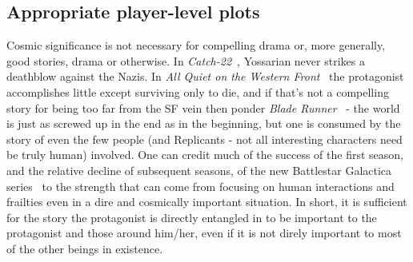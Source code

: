 \subsection{Appropriate player-level plots}

Cosmic significance is not necessary for compelling drama or, more
generally, good stories, drama or otherwise. In
\emph{Catch-22}~\cite{Catch22}, Yossarian never strikes a deathblow against
the Nazis. In \emph{All Quiet on the Western
Front}~\cite{AllQuietOnTheWesternFront} the protagonist accomplishes
little except surviving only to die, and if that's not a compelling
story for being too far from the SF vein then ponder \emph{Blade
Runner}~\cite{BladeRunner} - the world is just as screwed up in the end
as in the beginning, but one is consumed by the story of even the few
people (and Replicants - not all interesting characters need be truly
human) involved. One can credit much of the success of the first
season, and the relative decline of subsequent seasons, of the new
Battlestar Galactica series~\cite{NewBattleStar} to the strength that
can come from focusing on human interactions and frailties even in a
dire and cosmically important situation. In short, it is sufficient
for the story the protagonist is directly entangled in to be important
to the protagonist and those around him/her, even if it is not direly
important to most of the other beings in existence.

